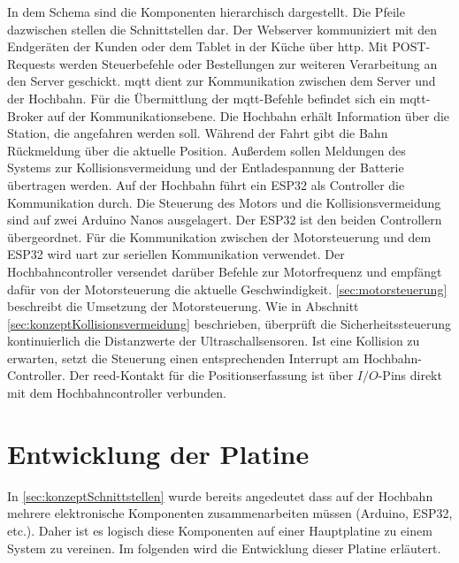 In dem Schema sind die Komponenten hierarchisch dargestellt. Die Pfeile dazwischen stellen die Schnittstellen dar. Der Webserver kommuniziert mit den Endgeräten der Kunden oder dem Tablet in der Küche über \acrshort{http}. Mit POST-Requests werden Steuerbefehle oder Bestellungen zur weiteren Verarbeitung an den Server geschickt.
\acrshort{mqtt} dient zur Kommunikation zwischen dem Server und der Hochbahn. Für die Übermittlung der \acrshort{mqtt}-Befehle  befindet sich ein \acrshort{mqtt}-Broker auf der Kommunikationsebene. Die Hochbahn erhält Information über die Station, die angefahren werden soll. Während der Fahrt gibt die Bahn Rückmeldung über die aktuelle Position. Außerdem sollen Meldungen des Systems zur Kollisionsvermeidung und der Entladespannung der Batterie übertragen werden. Auf der Hochbahn führt ein ESP32 als Controller die Kommunikation durch. Die Steuerung des Motors und die Kollisionsvermeidung sind auf zwei Arduino Nanos ausgelagert. Der ESP32 ist den beiden Controllern übergeordnet. Für die Kommunikation zwischen der Motorsteuerung und dem ESP32 wird \acrshort{uart} zur seriellen Kommunikation verwendet. Der Hochbahncontroller versendet darüber Befehle zur Motorfrequenz und empfängt dafür von der Motorsteuerung die aktuelle Geschwindigkeit. \autoref{sec:motorsteuerung} beschreibt die Umsetzung der Motorsteuerung. Wie in Abschnitt \ref{sec:konzeptKollisionsvermeidung} beschrieben, überprüft die Sicherheitssteuerung kontinuierlich die Distanzwerte der Ultraschallsensoren. Ist eine Kollision zu erwarten, setzt die Steuerung einen entsprechenden Interrupt am Hochbahn-Controller. Der \acrshort{reed}-Kontakt für die Positionserfassung ist über $I/O$-Pins direkt mit dem Hochbahncontroller verbunden. 

\chapter{Entwicklung der Platine}
In \autoref{sec:konzeptSchnittstellen} wurde bereits angedeutet dass auf der Hochbahn mehrere elektronische Komponenten zusammenarbeiten müssen (Arduino, ESP32, etc.). Daher ist es logisch diese Komponenten auf einer Hauptplatine zu einem System zu vereinen. 
Im folgenden wird die Entwicklung dieser Platine erläutert.

